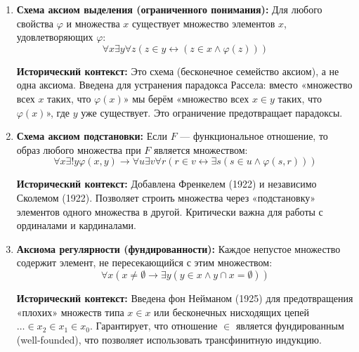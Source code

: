 \documentclass[11pt, a4paper]{extarticle}
\newcommand{\ph}{\varphi}
\newcommand{\ZF}{\ifmmode \mathsf{\color{darkred}ZF}\else ${\mathsf{\color{darkred}ZF}}$\fi\xspace}
\begin{document}
\begin{definition}[Аксиомы \ZF]
\begin{enumerate}
    \textbf{Исторический контекст:} Введена Цермело (1908) для гарантии существования бесконечных множеств. До этого бесконечность часто постулировалась неявно, что создавало проблемы.
    
    \item \textbf{Схема аксиом выделения (ограниченного понимания):} Для любого свойства $\ph$ и множества $x$ существует множество элементов $x$, удовлетворяющих $\ph$:
    $$\forall x \exists y \forall z (z \in y \leftrightarrow (z \in x \land \ph(z)))$$
    
    \textbf{Исторический контекст:} Это схема (бесконечное семейство аксиом), а не одна аксиома. Введена для устранения парадокса Рассела: вместо «множество всех $x$ таких, что $\ph(x)$» мы берём «множество всех $x \in y$ таких, что $\ph(x)$», где $y$ уже существует. Это ограничение предотвращает парадоксы.
    
    \item \textbf{Схема аксиом подстановки:} Если $F$ --- функциональное отношение, то образ любого множества при $F$ является множеством:
    $$\forall x \exists! y \ph(x,y) \rightarrow \forall u \exists v \forall r (r \in v \leftrightarrow \exists s (s \in u \land \ph(s,r)))$$
    
    \textbf{Исторический контекст:} Добавлена Френкелем (1922) и независимо Сколемом (1922). Позволяет строить множества через «подстановку» элементов одного множества в другой. Критически важна для работы с ординалами и кардиналами.
    
    \item \textbf{Аксиома регулярности (фундированности):} Каждое непустое множество содержит элемент, не пересекающийся с этим множеством:
    $$\forall x (x \neq \emptyset \rightarrow \exists y (y \in x \land y \cap x = \emptyset))$$
    
    \textbf{Исторический контекст:} Введена фон Нейманом (1925) для предотвращения «плохих» множеств типа $x \in x$ или бесконечных нисходящих цепей $\ldots \in x_2 \in x_1 \in x_0$. Гарантирует, что отношение $\in$ является фундированным (well-founded), что позволяет использовать трансфинитную индукцию.
\end{enumerate}
\end{definition}
\end{document}

